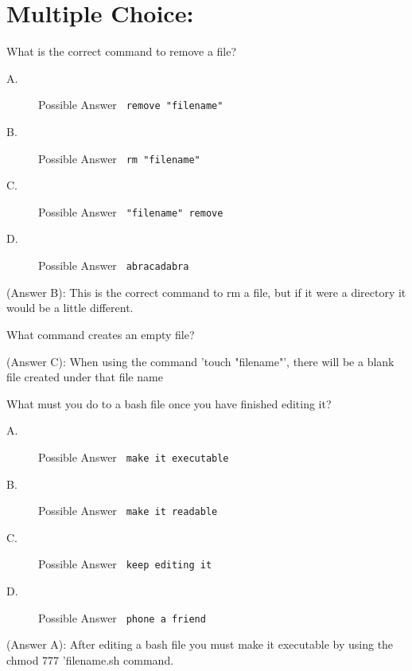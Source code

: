 \usepackage{color,geometry}
\usepackage{verbatim}
\usepackage{amsmath,amssymb}
\usepackage{graphicx}


\section*{Multiple Choice: } 
\begin{questions} 
\question What is the correct command to remove a file? 
\begin{description} 
\item[A.] Possible Answer \verb' remove "filename"' 
\item[B.] Possible Answer \verb' rm "filename"' 
\item[C.] Possible Answer \verb' "filename" remove' 
\item[D.] Possible Answer \verb' abracadabra' 
\end{description} 
\begin{solution} 
(Answer B): This is the correct command to rm a file, but if it were a directory it would be a little different.
\end{solution}

\question What command creates an empty file?
\begin{solution}
(Answer C): When using the command 'touch "filename"', there will be a blank file created under that file name
\end{solution}

\question What must you do to a bash file once you have finished editing it?
\begin{description}
\item[A.] Possible Answer \verb' make it executable'
\item[B.] Possible Answer \verb' make it readable'
\item[C.] Possible Answer \verb' keep editing it'
\item[D.] Possible Answer \verb' phone a friend'
\end{description}
\begin{solution}
(Answer A): After editing a bash file you must make it executable by using the chmod 777 'filename.sh command.
\end{solution}


\end{questions}

